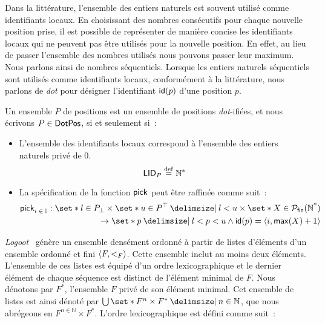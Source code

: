 Dans la littérature, l'ensemble des entiers naturels est souvent utilisé comme identifiants locaux.
En choisissant des nombres consécutifs pour chaque nouvelle position prise, il est possible de représenter de manière concise les identifiants locaux qui ne peuvent pas être utilisés pour la nouvelle position.
En effet, au lieu de passer l'ensemble des nombres utilisés nous pouvons passer leur maximum.
Nous parlons ainsi de nombres séquentiels.
Lorsque les entiers naturels séquentiels sont utilisés comme identifiants locaux, conformément à la littérature, nous parlons de \emph{dot} pour désigner l'identifiant $\trm{id}(p)$ d'une position $p$.

\begin{definition}\label{def:dot-pos}
Un ensemble $P$ de positions est un ensemble de positions \emph{dot}-ifiées, et nous écrivons $P \in \trm{DotPos}$, si et seulement si~:
\begin{itemize}
\item L'ensemble des identifiants locaux correspond à l'ensemble des entiers naturels privé de $0$.
\begin{equation*}
    \trm{LID}_P \defeq \mathbb{N}^*
\end{equation*}

\item La spécification de la fonction $\trm{pick}$ peut être raffinée comme suit~:
\begin{equation*}\begin{split}
    \trm{pick}_{i\;\in\;\mathbb{I}}: \set*{l \in P_{\bot}} \times \set*{u \in P^{\top} \given l < u} \times \set*{X \in \powerfset{\trm{\mathbb{N}^*}}}\\
    \to \set*{p \given l < p < u \land \trm{id}(p) = \tuple*{i, \trm{max}(X) + 1}}
\end{split}\end{equation*}
\end{itemize}
\end{definition}

\emph{Logoot}~\cite{weiss_2009_logoot} génère un ensemble densément ordonné à partir de listes d'éléments d'un ensemble ordonné et fini $\tuple*{F, <_F}$.
Cette ensemble inclut au moins deux éléments.
L'ensemble de ces listes est équipé d'un ordre lexicographique et le dernier élément de chaque séquence est distinct de l'élément minimal de $F$.
Nous dénotons par $F^*$, l'ensemble $F$ privé de son élément minimal.
Cet ensemble de listes est ainsi dénoté par $\bigcup \set*{F^n \times F^* \given n \in \mathbb{N}}$, que nous abrégeons en $F^{n \in \mathbb{N}} \times F^*$.
L'ordre lexicographique est défini comme suit~:


